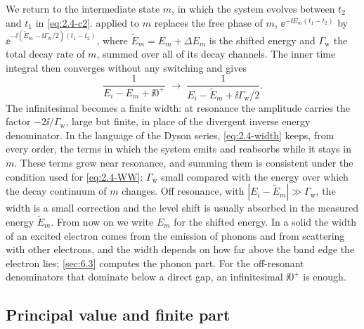 We return to the intermediate state $m$, in which the system evolves between $t_2$ and $t_1$ in \cref{eq:2.4-c2}.  applied to $m$ replaces the free phase of $m$, $\ee^{-\ii E_m(t_1 - t_2)}$ by $\ee^{-\ii(\tilde E_m - \ii\varGamma_{\mathrm{w}}/2)(t_1 - t_2)}$, where $\tilde E_m = E_m + \Delta E_m$ is the shifted energy and $\varGamma_{\mathrm{w}}$ the total decay rate of $m$, summed over all of its decay channels. The inner time integral then converges without any switching and gives
\begin{equation}
  \frac{1}{E_i - E_m + \ii0^+} \;\longrightarrow\; \frac{1}{E_i - \tilde E_m + \ii\varGamma_{\mathrm{w}}/2} .
  \label{eq:2.4-width}
\end{equation}
The infinitesimal becomes a finite width: at resonance the amplitude carries the factor $-2\ii/\varGamma_{\mathrm{w}}$, large but finite, in place of the divergent inverse energy denominator. In the language of the Dyson series, \cref{eq:2.4-width} keeps, from every order, the terms in which the system emits and reabsorbs while it stays in $m$. These terms grow near resonance, and summing them is consistent under the condition used for \cref{eq:2.4-WW}: $\varGamma_{\mathrm{w}}$ small compared with the energy over which the decay continuum of $m$ changes. Off resonance, with $|E_i - \tilde E_m| \gg \varGamma_{\mathrm{w}}$, the width is a small correction and the level shift is usually absorbed in the measured energy $\tilde E_m$. From now on we write $E_m$ for the shifted energy. In a solid the width of an excited electron comes from the emission of phonons and from scattering with other electrons, and the width depends on how far above the band edge the electron lies; \cref{sec:6.3} computes the phonon part. For the off-resonant denominators that dominate below a direct gap, an infinitesimal $\ii0^+$ is enough.

\subsection{Principal value and finite part}


